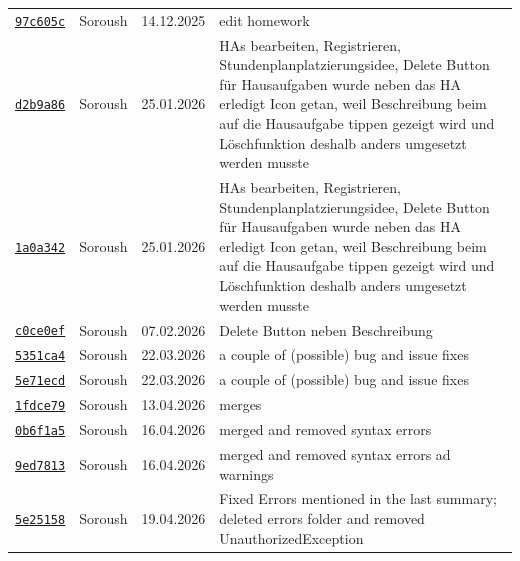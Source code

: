 \documentclass{article}%
\begin{document}
\begin{longtable}{l l l p{12cm}}
\href{https://github.com/scriptor1000/homeworks/pull/21/commits/97c605c8d3963e03b542cb771b6d5626b42dd9f0}{\underline{\texttt{97c605c}}}&Soroush&14.12.2025&edit homework\\%
\href{https://github.com/scriptor1000/homeworks/pull/21/commits/d2b9a8673b4a7fd7d34755bc1c8bc05c2dae3ab6}{\underline{\texttt{d2b9a86}}}&Soroush&25.01.2026&HAs bearbeiten, Registrieren, Stundenplanplatzierungsidee, Delete Button für Hausaufgaben wurde neben das HA erledigt Icon getan, weil Beschreibung beim auf die Hausaufgabe tippen gezeigt wird und Löschfunktion deshalb anders umgesetzt werden musste\\%
\href{https://github.com/scriptor1000/homeworks/pull/21/commits/1a0a34258d13b08647c2e2b1c2ac2803f89e9ecf}{\underline{\texttt{1a0a342}}}&Soroush&25.01.2026&HAs bearbeiten, Registrieren, Stundenplanplatzierungsidee, Delete Button für Hausaufgaben wurde neben das HA erledigt Icon getan, weil Beschreibung beim auf die Hausaufgabe tippen gezeigt wird und Löschfunktion deshalb anders umgesetzt werden musste\\%
\href{https://github.com/scriptor1000/homeworks/pull/21/commits/c0ce0ef14e12e023e7f73be000a2ef12fa1ac8a1}{\underline{\texttt{c0ce0ef}}}&Soroush&07.02.2026&Delete Button neben Beschreibung\\%
\href{https://github.com/scriptor1000/homeworks/pull/21/commits/5351ca466223660a18969746a29832e3e22abbba}{\underline{\texttt{5351ca4}}}&Soroush&22.03.2026&a couple of (possible) bug and issue fixes\\%
\href{https://github.com/scriptor1000/homeworks/pull/21/commits/5e71ecd8832f6d4808d40c79b2dcaec89a357d48}{\underline{\texttt{5e71ecd}}}&Soroush&22.03.2026&a couple of (possible) bug and issue fixes\\%
\href{https://github.com/scriptor1000/homeworks/pull/21/commits/1fdce79d46c593743f8aaecda4907d0968b0566b}{\underline{\texttt{1fdce79}}}&Soroush&13.04.2026&merges\\%
\href{https://github.com/scriptor1000/homeworks/pull/21/commits/0b6f1a5da5266e09ad6ee81677eb94290807f3d0}{\underline{\texttt{0b6f1a5}}}&Soroush&16.04.2026&merged and removed syntax errors\\%
\href{https://github.com/scriptor1000/homeworks/pull/21/commits/9ed781386d52009c59f48093b5373596c8b0a96c}{\underline{\texttt{9ed7813}}}&Soroush&16.04.2026&merged and removed syntax errors ad warnings\\%
\href{https://github.com/scriptor1000/homeworks/pull/21/commits/5e25158c7f1c92c978f14771843cdd3ca9b25c67}{\underline{\texttt{5e25158}}}&Soroush&19.04.2026&Fixed Errors mentioned in the last summary; deleted errors folder and removed UnauthorizedException\\%

\end{longtable}
\end{document}
